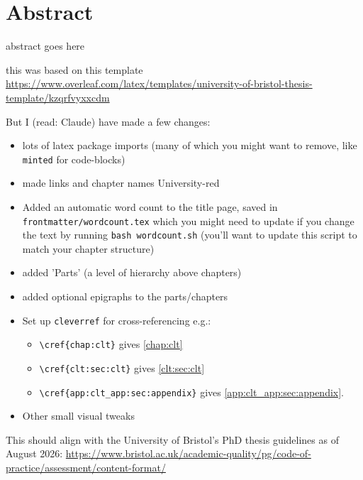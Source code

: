 %
%
%

\chapter*{Abstract}
\begin{SingleSpace}

abstract goes here

this was based on this template \url{https://www.overleaf.com/latex/templates/university-of-bristol-thesis-template/kzqrfvyxxcdm}

But I (read: Claude) have made a few changes:
\begin{itemize}
    \item lots of latex package imports (many of which you might want to remove, like \texttt{minted} for code-blocks)
    \item made links and chapter names University-red 
    \item Added an automatic word count to the title page, saved in \texttt{frontmatter/wordcount.tex} which you might need to update if you change the text by running \texttt{bash wordcount.sh} (you'll want to update this script to match your chapter structure)
    \item added 'Parts' (a level of hierarchy above chapters)
    \item added optional epigraphs to the parts/chapters
    \item Set up \texttt{cleverref} for cross-referencing e.g.:
    \begin{itemize}
    \item \verb|\cref{chap:clt}| gives \cref{chap:clt}
    \item \verb|\cref{clt:sec:clt}| gives \cref{clt:sec:clt}
    \item \verb|\cref{app:clt_app:sec:appendix}| gives \cref{app:clt_app:sec:appendix}.
    \end{itemize}
    \item Other small visual tweaks
\end{itemize}

This should align with the University of Bristol's PhD thesis guidelines as of August 2026:
\url{https://www.bristol.ac.uk/academic-quality/pg/code-of-practice/assessment/content-format/}

\end{SingleSpace}
\clearpage
